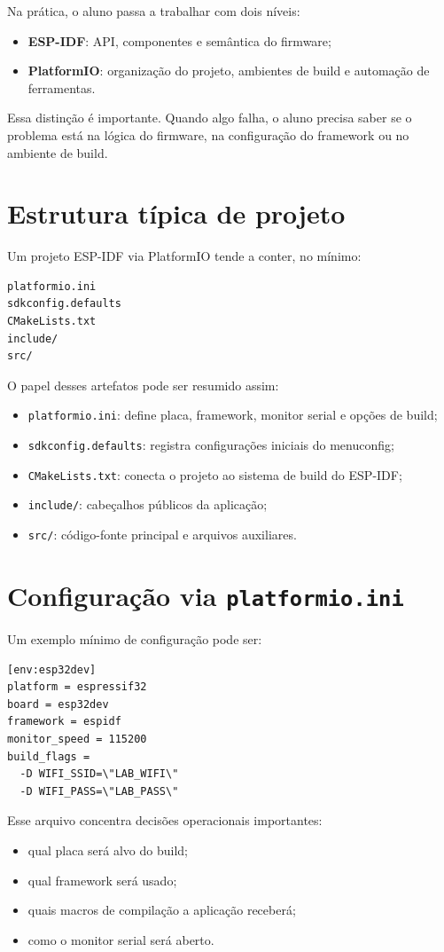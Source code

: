 Na prática, o aluno passa a trabalhar com dois níveis:
\begin{itemize}[leftmargin=*]
  \item \textbf{ESP-IDF}: API, componentes e semântica do firmware;
  \item \textbf{PlatformIO}: organização do projeto, ambientes de build e automação de ferramentas.
\end{itemize}

Essa distinção é importante. Quando algo falha, o aluno precisa saber se o problema está na lógica do firmware, na configuração do framework ou no ambiente de build.

\section{Estrutura típica de projeto}
Um projeto ESP-IDF via PlatformIO tende a conter, no mínimo:
\begin{verbatim}
platformio.ini
sdkconfig.defaults
CMakeLists.txt
include/
src/
\end{verbatim}

O papel desses artefatos pode ser resumido assim:
\begin{itemize}[leftmargin=*]
  \item \texttt{platformio.ini}: define placa, framework, monitor serial e opções de build;
  \item \texttt{sdkconfig.defaults}: registra configurações iniciais do menuconfig;
  \item \texttt{CMakeLists.txt}: conecta o projeto ao sistema de build do ESP-IDF;
  \item \texttt{include/}: cabeçalhos públicos da aplicação;
  \item \texttt{src/}: código-fonte principal e arquivos auxiliares.
\end{itemize}

\section{Configuração via \texttt{platformio.ini}}
Um exemplo mínimo de configuração pode ser:
\begin{verbatim}
[env:esp32dev]
platform = espressif32
board = esp32dev
framework = espidf
monitor_speed = 115200
build_flags =
  -D WIFI_SSID=\"LAB_WIFI\"
  -D WIFI_PASS=\"LAB_PASS\"
\end{verbatim}

Esse arquivo concentra decisões operacionais importantes:
\begin{itemize}[leftmargin=*]
  \item qual placa será alvo do build;
  \item qual framework será usado;
  \item quais macros de compilação a aplicação receberá;
  \item como o monitor serial será aberto.
\end{itemize}

